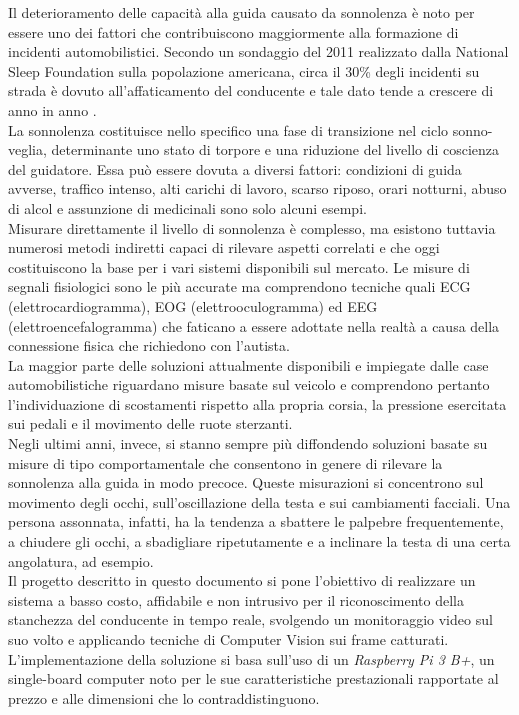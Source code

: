 \documentclass[12pt]{article}
\begin{document}
Il deterioramento delle capacità alla guida causato da sonnolenza è noto per essere uno dei fattori che contribuiscono maggiormente alla formazione di incidenti automobilistici. Secondo un sondaggio del 2011 realizzato dalla National Sleep Foundation sulla popolazione americana, circa il 30\% degli incidenti su strada è dovuto all'affaticamento del conducente e tale dato tende a crescere di anno in anno \cite{SleepInAmerica}.\\
La sonnolenza costituisce nello specifico una fase di transizione nel ciclo sonno-veglia, determinante uno stato di torpore e una riduzione del livello di coscienza del guidatore. Essa può essere dovuta a diversi fattori: condizioni di guida avverse, traffico intenso, alti carichi di lavoro, scarso riposo, orari notturni, abuso di alcol e assunzione di medicinali sono solo alcuni esempi.\\
Misurare direttamente il livello di sonnolenza è complesso, ma esistono tuttavia numerosi metodi indiretti capaci di rilevare aspetti correlati e che oggi costituiscono la base per i vari sistemi disponibili sul mercato. Le misure di segnali fisiologici sono le più accurate ma comprendono tecniche quali ECG (elettrocardiogramma), EOG (elettrooculogramma) ed EEG (elettroencefalogramma) che faticano a essere adottate nella realtà a causa della connessione fisica che richiedono con l'autista.\\
La maggior parte delle soluzioni attualmente disponibili e impiegate dalle case automobilistiche riguardano misure basate sul veicolo e comprendono pertanto l'individuazione di scostamenti rispetto alla propria corsia, la pressione esercitata sui pedali e il movimento delle ruote sterzanti.\\
Negli ultimi anni, invece, si stanno sempre più diffondendo soluzioni basate su misure di tipo comportamentale che consentono in genere di rilevare la sonnolenza alla guida in modo precoce. Queste misurazioni si concentrono sul movimento degli occhi, sull'oscillazione della testa e sui cambiamenti facciali. Una persona assonnata, infatti, ha la tendenza a sbattere le palpebre frequentemente, a chiudere gli occhi, a sbadigliare ripetutamente e a inclinare la testa di una certa angolatura, ad esempio.\\
Il progetto descritto in questo documento si pone l'obiettivo di realizzare un sistema a basso costo, affidabile e non intrusivo per il riconoscimento della stanchezza del conducente in tempo reale, svolgendo un monitoraggio video sul suo volto e applicando tecniche di Computer Vision sui frame catturati. L'implementazione della soluzione si basa sull'uso di un \textit{Raspberry Pi 3 B+}, un single-board computer noto per le sue caratteristiche prestazionali rapportate al prezzo e alle dimensioni che lo contraddistinguono.\\
\end{document}
